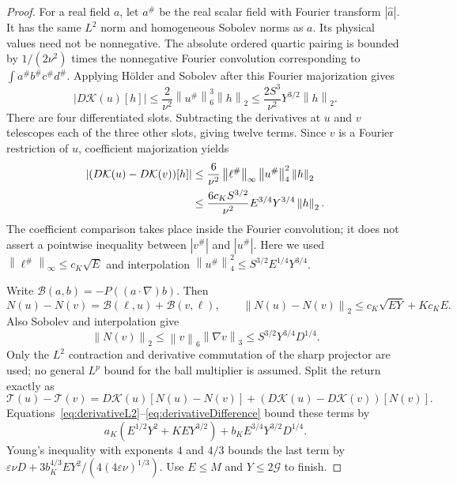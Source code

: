 \documentclass[11pt]{article}
\newcommand{\norm}[1]{\left\lVert#1\right\rVert}
\begin{document}
\begin{proof}
For a real field $a$, let $a^\#$ be the real scalar field with Fourier
transform $|\widehat a|$. It has the same $L^2$ norm and homogeneous
Sobolev norms as $a$. Its physical values need not be nonnegative.
The absolute ordered quartic pairing is bounded by $1/(2\nu^2)$ times
the nonnegative Fourier convolution corresponding to
$\int a^\#b^\#c^\#d^\#$. Applying H\"older and Sobolev after this
Fourier majorization gives
\begin{equation}\label{eq:derivativeL2}
 |D\mathcal K(u)[h]|\leq\frac{2}{\nu^2}
                    \norm{u^\#}_6^3\norm h_2
 \leq\frac{2S^3}{\nu^2}Y^{3/2}\norm h_2.
\end{equation}
There are four differentiated slots. Subtracting the derivatives at $u$
and $v$ telescopes each of the three other slots, giving twelve terms.
Since $v$ is a Fourier restriction of $u$, coefficient majorization yields
\begin{align}
 |(D\mathcal K(u)-D\mathcal K(v))[h]|
 &\leq\frac6{\nu^2}\norm{\ell^\#}_\infty
                         \norm{u^\#}_4^2\norm h_2\notag\\
 &\leq\frac{6c_KS^{3/2}}{\nu^2}
                      E^{3/4}Y^{3/4}\norm h_2.\label{eq:derivativeDifference}
\end{align}
The coefficient comparison takes place inside the Fourier convolution;
it does not assert a pointwise inequality between $|v^\#|$ and $|u^\#|$.
Here we used $\norm{\ell^\#}_\infty\leq c_K\sqrt E$ and interpolation
$\norm{u^\#}_4^2\leq S^{3/2}E^{1/4}Y^{3/4}$.

Write $\mathcal B(a,b)=-P((a\cdot\nabla)b)$. Then
\[
 N(u)-N(v)=\mathcal B(\ell,u)+\mathcal B(v,\ell),\qquad
 \norm{N(u)-N(v)}_2\leq c_K\sqrt{EY}+Kc_KE.
\]
Also Sobolev and interpolation give
\[
 \norm{N(v)}_2\leq\norm v_6\norm{\nabla v}_3
       \leq S^{3/2}Y^{3/4}D^{1/4}.
\]
Only the $L^2$ contraction and derivative commutation of the sharp
projector are used; no general $L^p$ bound for the ball multiplier is assumed.
Split the return exactly as
\[
 \mathcal T(u)-\mathcal T(v)
 =D\mathcal K(u)[N(u)-N(v)]
       +(D\mathcal K(u)-D\mathcal K(v))[N(v)].
\]
Equations~\eqref{eq:derivativeL2}--\eqref{eq:derivativeDifference} bound
these terms by
\[
 a_K(E^{1/2}Y^2+KEY^{3/2})
                  +b_KE^{3/4}Y^{3/2}D^{1/4}.
\]
Young's inequality with exponents $4$ and $4/3$ bounds the last term by
$\varepsilon\nu D+3b_K^{4/3}EY^2/(4(4\varepsilon\nu)^{1/3})$.
Use $E\leq M$ and $Y\leq2\mathcal G$ to finish.
\end{proof}
\end{document}
